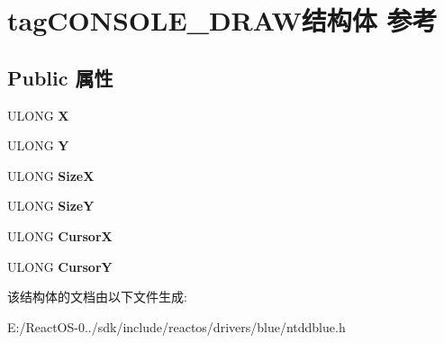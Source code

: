\hypertarget{structtag_c_o_n_s_o_l_e___d_r_a_w}{}\section{tag\+C\+O\+N\+S\+O\+L\+E\+\_\+\+D\+R\+A\+W结构体 参考}
\label{structtag_c_o_n_s_o_l_e___d_r_a_w}
\subsection*{Public 属性}
\begin{DoxyCompactItemize}
\item 
\mbox{\label{structtag_c_o_n_s_o_l_e___d_r_a_w_af70983e545358b59b1ffcb1a82cd4885}} 
U\+L\+O\+NG {\bfseries X}
\item 
\mbox{\label{structtag_c_o_n_s_o_l_e___d_r_a_w_a52e5c53da684e53272cbaea1d5026fbd}} 
U\+L\+O\+NG {\bfseries Y}
\item 
\mbox{\label{structtag_c_o_n_s_o_l_e___d_r_a_w_afef063857d4ec0fa0830fa71133a106a}} 
U\+L\+O\+NG {\bfseries SizeX}
\item 
\mbox{\label{structtag_c_o_n_s_o_l_e___d_r_a_w_a5b4f43d35f68b807ef00a44c189ba63c}} 
U\+L\+O\+NG {\bfseries SizeY}
\item 
\mbox{\label{structtag_c_o_n_s_o_l_e___d_r_a_w_a100d74bd088dbf16da40080db07d4bac}} 
U\+L\+O\+NG {\bfseries CursorX}
\item 
\mbox{\label{structtag_c_o_n_s_o_l_e___d_r_a_w_a5525ca07be23fc6316cda33c00cb4837}} 
U\+L\+O\+NG {\bfseries CursorY}
\end{DoxyCompactItemize}


该结构体的文档由以下文件生成\+:\begin{DoxyCompactItemize}
\item 
E\+:/\+React\+O\+S-\/0../sdk/include/reactos/drivers/blue/ntddblue.\+h\end{DoxyCompactItemize}
